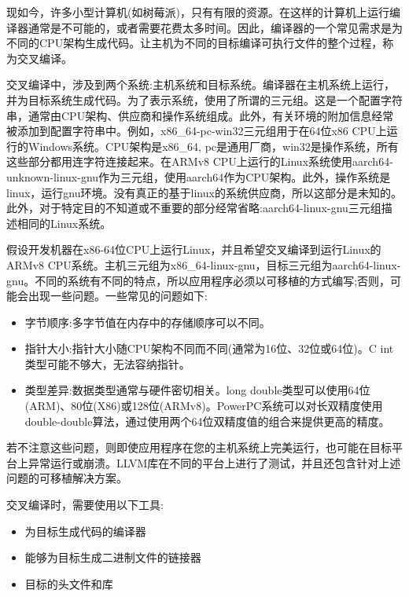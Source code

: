 现如今，许多小型计算机(如树莓派)，只有有限的资源。在这样的计算机上运行编译器通常是不可能的，或者需要花费太多时间。因此，编译器的一个常见需求是为不同的CPU架构生成代码。让主机为不同的目标编译可执行文件的整个过程，称为交叉编译。

交叉编译中，涉及到两个系统:主机系统和目标系统。编译器在主机系统上运行，并为目标系统生成代码。为了表示系统，使用了所谓的三元组。这是一个配置字符串，通常由CPU架构、供应商和操作系统组成。此外，有关环境的附加信息经常被添加到配置字符串中。例如，x86\_64-pc-win32三元组用于在64位x86 CPU上运行的Windows系统。CPU架构是x86\_64, pc是通用厂商，win32是操作系统，所有这些部分都用连字符连接起来。在ARMv8 CPU上运行的Linux系统使用aarch64-unknown-linux-gnu作为三元组，使用aarch64作为CPU架构。此外，操作系统是linux，运行gnu环境。没有真正的基于linux的系统供应商，所以这部分是未知的。此外，对于特定目的不知道或不重要的部分经常省略:aarch64-linux-gnu三元组描述相同的Linux系统。

假设开发机器在x86-64位CPU上运行Linux，并且希望交叉编译到运行Linux的ARMv8 CPU系统。主机三元组为x86\_64-linux-gnu，目标三元组为aarch64-linux-gnu。不同的系统有不同的特点，所以应用程序必须以可移植的方式编写;否则，可能会出现一些问题。一些常见的问题如下:

\begin{itemize}
\item
字节顺序:多字节值在内存中的存储顺序可以不同。

\item
指针大小:指针大小随CPU架构不同而不同(通常为16位、32位或64位)。C int类型可能不够大，无法容纳指针。

\item
类型差异:数据类型通常与硬件密切相关。long double类型可以使用64位(ARM)、80位(X86)或128位(ARMv8)。PowerPC系统可以对长双精度使用double-double算法，通过使用两个64位双精度值的组合来提供更高的精度。
\end{itemize}

若不注意这些问题，则即使应用程序在您的主机系统上完美运行，也可能在目标平台上异常运行或崩溃。LLVM库在不同的平台上进行了测试，并且还包含针对上述问题的可移植解决方案。

交叉编译时，需要使用以下工具:

\begin{itemize}
\item
为目标生成代码的编译器

\item
能够为目标生成二进制文件的链接器

\item
目标的头文件和库
\end{itemize}

